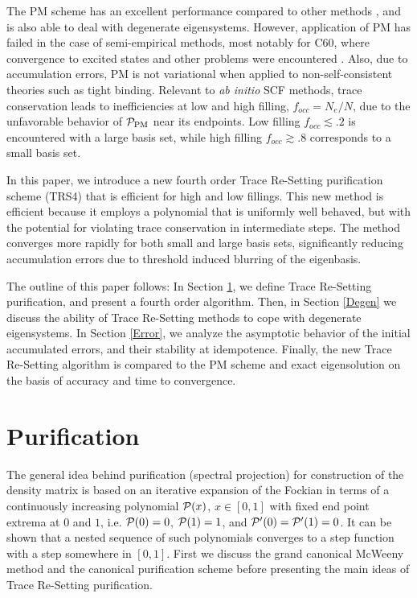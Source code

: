 \commentoutA{\documentclass[prb,aps,twocolumn,twocolumngrid,secnumarabic]{revtex4}}
\begin{document}
The PM scheme has an excellent performance compared to other methods \cite{APalser99,ADaniels99}, and is also
able to deal with degenerate eigensystems.  However, application of PM has failed in the case of 
semi-empirical methods, most notably for C60, where convergence to excited states and other problems
were encountered \cite{ADaniels99}.   Also, due to accumulation errors, PM is 
not variational when applied to non-self-consistent theories such as tight binding\cite{DBowler99}.
Relevant to {\it ab initio} SCF methods, trace conservation leads to  inefficiencies at low 
and high filling, $f_{occ}=N_e/N$, due to the unfavorable behavior of ${\cal P}_{\rm PM}$ near 
its endpoints.  Low filling $f_{occ}\lesssim .2$  is encountered 
with a large basis set, while high filling $f_{occ} \gtrsim .8$ corresponds to a small basis set.

In this paper, we introduce a new fourth order Trace Re-Setting purification scheme (TRS4) 
that is efficient for high and low fillings.  This new method is 
efficient because it employs a polynomial that is uniformly well behaved, but with the
potential for violating trace conservation in intermediate steps.  The method
converges more rapidly for both small and large basis sets, significantly reducing 
accumulation errors due to threshold induced blurring of the eigenbasis.

The outline of this paper follows:  In Section \ref{TSP}, we define Trace Re-Setting purification,
and present a fourth order algorithm.  Then, in Section \ref{Degen} we discuss the ability of
Trace Re-Setting methods to cope with degenerate eigensystems.  In Section \ref{Error}, we
analyze the asymptotic behavior of the initial accumulated errors, and their stability 
at idempotence.  Finally, the new Trace Re-Setting algorithm is compared 
to the PM scheme and exact eigensolution on the basis of accuracy and time to convergence.

\section{Purification}\label{TSP}

The general idea behind purification (spectral projection) for construction 
of the density matrix is based on an iterative expansion of the
Fockian in terms of a continuously increasing 
polynomial ${\cal P}(x)$, $x \in [0,1]$  with fixed end point extrema
at $0$ and $1$, i.e. ${\cal P}(0) = 0$, ${\cal P}(1) = 1$, and ${\cal P}'(0)={\cal P}'(1)=0$. 
It can be shown that a nested sequence of such polynomials 
converges to a step function with a step somewhere in $[0,1]$. 
First we discuss the grand canonical McWeeny method and the canonical
purification scheme before presenting the main ideas of Trace Re-Setting purification.
\end{document}
